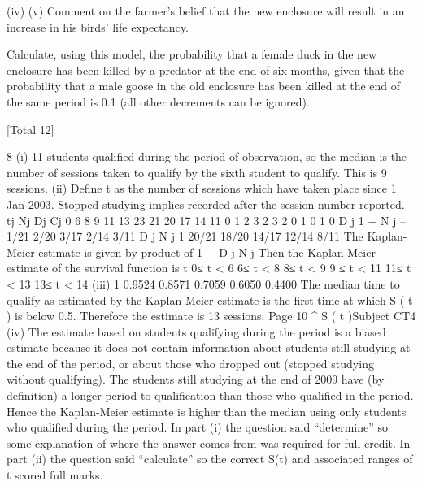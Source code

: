  
(iv)
(v)
Comment on the farmer’s belief that the new enclosure will result in an
increase in his birds’ life expectancy.
 
Calculate, using this model, the probability that a female duck in the new
enclosure has been killed by a predator at the end of six months, given that the
probability that a male goose in the old enclosure has been killed at the end of
the same period is 0.1 (all other decrements can be ignored).

[Total 12]



8
(i)
11 students qualified during the period of observation, so the median is the
number of sessions taken to qualify by the sixth student to qualify.
This is 9 sessions.
(ii)
Define t as the number of sessions which have taken place since 1 Jan 2003.
Stopped studying implies recorded after the session number reported.
tj Nj Dj Cj
0
6
8
9
11
13 23
21
20
17
14
11 0
1
2
3
2
3 2
0
1
0
1
0
D j
1 −
N j
–
1/21
2/20
3/17
2/14
3/11
D j
N j
1
20/21
18/20
14/17
12/14
8/11
The Kaplan-Meier estimate is given by product of 1 −
D j
N j
Then the Kaplan-Meier estimate of the survival function is
t
0≤ t < 6
6≤ t < 8
8≤ t < 9
9 ≤ t < 11
11≤ t < 13
13≤ t < 14
(iii)
1
0.9524
0.8571
0.7059
0.6050
0.4400
The median time to qualify as estimated by the Kaplan-Meier estimate
is the first time at which S ( t ) is below 0.5.
Therefore the estimate is 13 sessions.
Page 10
^
S ( t )Subject CT4 %
(iv)
The estimate based on students qualifying during the period
is a biased estimate because it does not contain information
about students still studying at the end of the period, or about
those who dropped out (stopped studying without qualifying).
The students still studying at the end of 2009 have (by definition) a longer
period to qualification than those who qualified in the period.
Hence the Kaplan-Meier estimate is higher than the median using
only students who qualified during the period.
In part (i) the question said “determine” so some explanation of where the answer comes
from was required for full credit. In part (ii) the question said “calculate” so the correct S(t)
and associated ranges of t scored full marks.
\newpage

